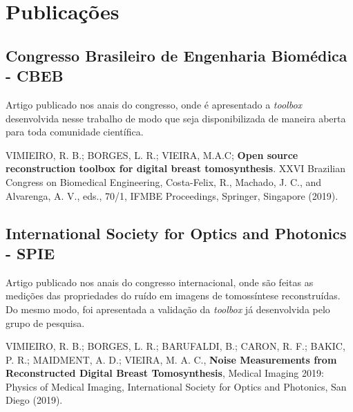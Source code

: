 \chapter[Publicações]{Publicações}\label{Capitulo9}

\section{Congresso Brasileiro de Engenharia Biomédica - CBEB}

Artigo publicado nos anais do congresso, onde é apresentado a \textit{toolbox} desenvolvida nesse trabalho de modo que seja disponibilizada de maneira aberta para toda comunidade científica.

VIMIEIRO, R. B.; BORGES, L. R.; VIEIRA, M.A.C; \textbf{Open source reconstruction toolbox for digital breast tomosynthesis}. XXVI Brazilian Congress on Biomedical Engineering, Costa-Felix, R., Machado,
J. C., and Alvarenga, A. V., eds., 70/1, IFMBE Proceedings, Springer, Singapore (2019).


\section{International Society for Optics and Photonics - SPIE}

Artigo publicado nos anais do congresso internacional, onde são feitas as medições das propriedades do ruído em imagens de tomossíntese reconstruídas. Do mesmo modo, foi apresentada a validação da \textit{toolbox} já desenvolvida pelo grupo de pesquisa.

VIMIEIRO, R. B.; BORGES, L. R.; BARUFALDI, B.; CARON, R. F.; BAKIC, P. R.; MAIDMENT, A. D.; VIEIRA, M. A. C., \textbf{Noise Measurements from Reconstructed Digital Breast Tomosynthesis}, Medical
Imaging 2019: Physics of Medical Imaging, International Society for Optics and Photonics, San Diego
(2019).

